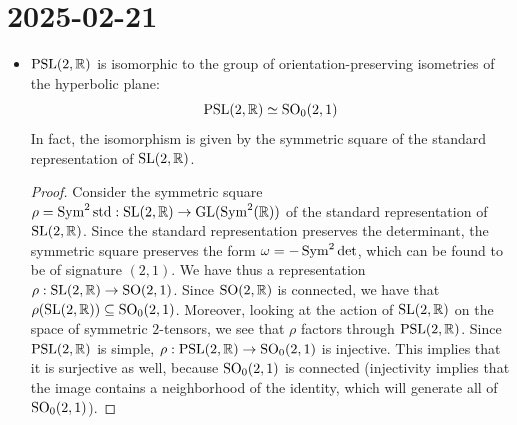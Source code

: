 \documentclass{report}
\begin{document}
\section{2025-02-21}
\begin{itemize}
    \item $\operatorname{{\mathrm{PSL}}}(2,\mathbb R)$ is isomorphic to the group of orientation-preserving isometries of the hyperbolic plane:
    \[
    \operatorname{{\mathrm{PSL}}}(2,\mathbb R) \simeq \operatorname{{\mathrm{SO}}}_0(2,1)
    \]
    In fact, the isomorphism is given by the symmetric square of the standard representation of $\operatorname{{\mathrm{SL}}}(2,\mathbb R)$.
    \begin{proof}
        Consider the symmetric square $\rho = \operatorname{Sym}^2 \mathrm{std}: \operatorname{{\mathrm{SL}}}(2,\mathbb R) \to \operatorname{{\mathrm{GL}}}(\operatorname{Sym}^2(\mathbb R))$ of the standard representation of $\operatorname{{\mathrm{SL}}}(2,\mathbb R)$.
        Since the standard representation preserves the determinant, the symmetric square preserves the form $\omega = -\operatorname{Sym}^2\det$, which can be found to be of signature $(2,1)$.
        We have thus a representation $\rho: \operatorname{{\mathrm{SL}}}(2,\mathbb R) \to \operatorname{{\mathrm{SO}}}(2,1)$.
        Since $\operatorname{{\mathrm{SO}}}(2,\mathbb R)$ is connected, we have that $\rho(\operatorname{{\mathrm{SL}}}(2,\mathbb R)) \subseteq \operatorname{{\mathrm{SO}}}_0(2,1)$.
        Moreover, looking at the action of $\operatorname{{\mathrm{SL}}}(2,\mathbb R)$ on the space of symmetric $2$-tensors, we see that $\rho$ factors through $\operatorname{{\mathrm{PSL}}}(2,\mathbb R)$.
        Since $\operatorname{{\mathrm{PSL}}}(2,\mathbb R)$ is simple, $\rho:\operatorname{{\mathrm{PSL}}}(2,\mathbb R) \to \operatorname{{\mathrm{SO}}}_0(2,1)$ is injective.
        This implies that it is surjective as well, because $\operatorname{{\mathrm{SO}}}_0(2,1)$ is connected (injectivity implies that the image contains a neighborhood of the identity, which will generate all of $\operatorname{{\mathrm{SO}}}_0(2,1)$).
    \end{proof}
\end{itemize}
\end{document}
